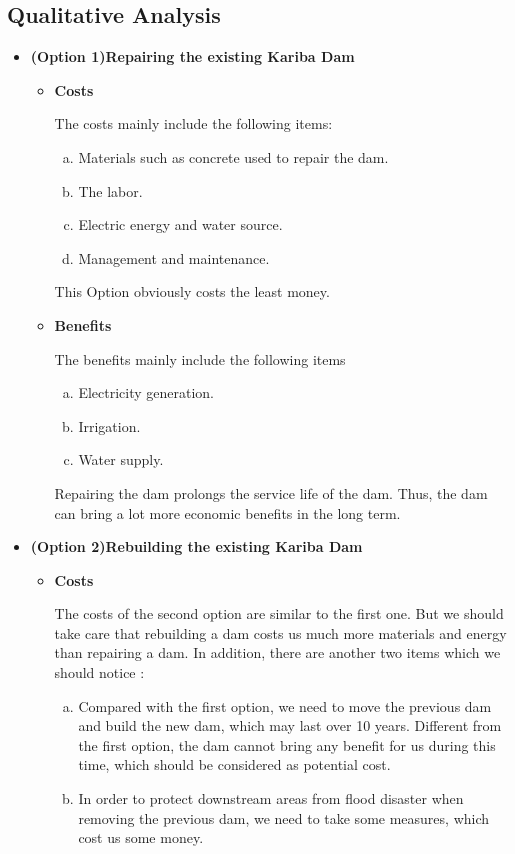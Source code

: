 \documentclass[12pt]{article}%
\begin{document}
\subsection{Qualitative Analysis}
\begin{itemize}
    \item{\textbf{(Option 1)Repairing the existing Kariba Dam}}
	\begin{itemize}
    	\item{\textbf{Costs}}
		\par\noindent
		The costs mainly include the following items:
			\begin{enumerate}[a.]
			\item Materials such as concrete used to repair the dam.
			\item The labor.
			\item Electric energy and water source.
			\item Management and maintenance.
			\end{enumerate}
		This Option obviously costs the least money.

    	\item{\textbf{Benefits}}
		\par\noindent
		The benefits mainly include the following items
			\begin{enumerate}[a.]
			\item Electricity generation.
			\item Irrigation.
			\item Water supply.
			\end{enumerate}
		Repairing the dam prolongs the service life of the dam. Thus, the dam can bring a lot more economic benefits in the long term.
	\end{itemize}
    \item{\textbf{(Option 2)Rebuilding the existing Kariba Dam}}
	\begin{itemize}
    	\item{\textbf{Costs}}
		\par\noindent
		The costs of the second option are similar to the first one. But we should take care that rebuilding a dam costs us much more materials and energy than repairing a dam. In addition, there are another two items which we should notice :
			\begin{enumerate}[a.]
			\item Compared with the first option, we need to move the previous dam and build the new dam, which may last over 10 years. Different from the first option, the dam cannot bring any benefit for us during this time, which should be considered as potential cost.
			\item In order to protect downstream areas from flood disaster when removing the previous dam, we need to take some measures, which cost us some money.
			\end{enumerate}


\end{itemize}
\end{itemize}
\end{document}
